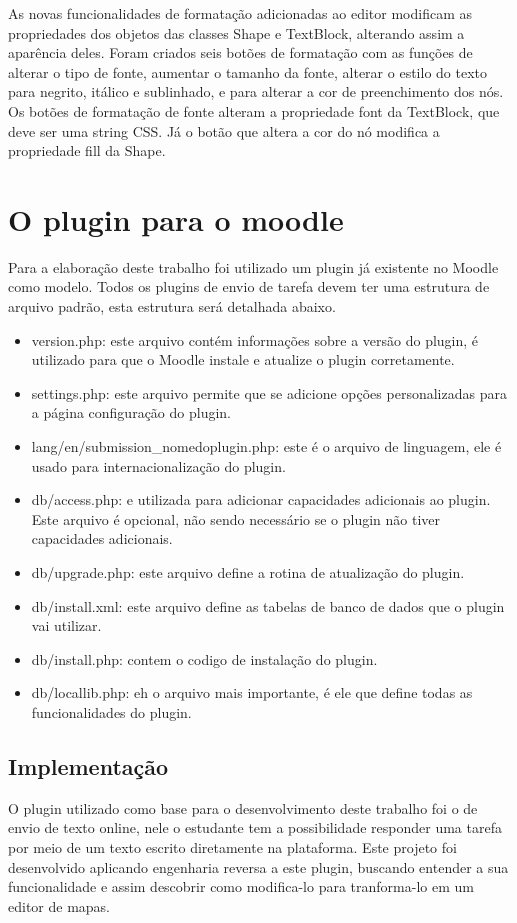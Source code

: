\documentclass[
	12pt,				%
	openright,			%
	oneside,			%
	a4paper,			%
	english,			%
	french,				%
	spanish,			%
	brazil				%
	]{abntex2}
\begin{document}
As novas funcionalidades de formatação adicionadas ao editor modificam as propriedades dos objetos das classes Shape e TextBlock, alterando assim a aparência deles. Foram criados seis botões de formatação com as funções de alterar o tipo de fonte, aumentar o tamanho da fonte, alterar o estilo do texto para negrito, itálico e sublinhado, e para alterar a cor de preenchimento dos nós. Os botões de formatação de fonte alteram a propriedade font da TextBlock, que deve ser uma string  CSS. Já o botão que altera a cor do nó modifica a propriedade fill da Shape.

\section{O plugin para o moodle} 
Para a elaboração deste trabalho foi utilizado um plugin já existente no Moodle como modelo. Todos os plugins de envio de tarefa devem ter uma estrutura de arquivo padrão, esta estrutura será detalhada abaixo.
\begin{itemize}
	\item version.php: este arquivo contém informações sobre a versão do plugin, é utilizado para que o Moodle instale e atualize o plugin corretamente.
	\item settings.php: este arquivo permite que se adicione opções personalizadas para a página configuração do plugin.
	\item lang/en/submission\_nomedoplugin.php:  este é o arquivo de linguagem, ele é usado para internacionalização do plugin.
	\item db/access.php: e utilizada para adicionar capacidades adicionais ao plugin. Este arquivo é opcional, não sendo necessário se o plugin não tiver capacidades adicionais.
	\item db/upgrade.php: este arquivo define a rotina de atualização do plugin. 
	\item db/install.xml: este arquivo define as tabelas de banco de dados que o plugin vai utilizar. 
	\item db/install.php: contem o codigo de instalação do plugin.
	\item db/locallib.php: eh o arquivo mais importante, é ele que define todas as funcionalidades do plugin.    
\end{itemize} 

\subsection{Implementação}
O plugin utilizado como base para o desenvolvimento deste trabalho foi o de envio de texto online, nele o estudante tem a possibilidade responder uma tarefa por meio de um texto escrito diretamente na plataforma. Este projeto foi desenvolvido aplicando engenharia reversa a este plugin, buscando entender a sua funcionalidade e assim descobrir como modifica-lo para tranforma-lo em um editor de mapas.
\end{document}
